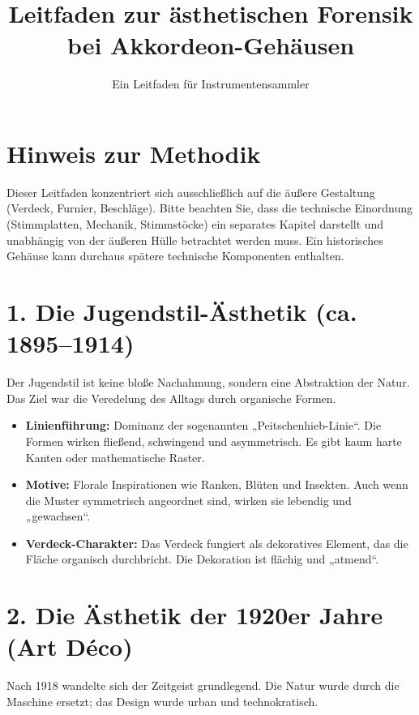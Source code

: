 \documentclass[12pt,a4paper]{report}
\title{Leitfaden zur ästhetischen Forensik bei Akkordeon-Gehäusen}
\author{Ein Leitfaden für Instrumentensammler}
\date{}
\begin{document}
	
	\maketitle
	
	\section*{Hinweis zur Methodik}
	Dieser Leitfaden konzentriert sich ausschließlich auf die äußere Gestaltung (Verdeck, Furnier, Beschläge). Bitte beachten Sie, dass die technische Einordnung (Stimmplatten, Mechanik, Stimmstöcke) ein separates Kapitel darstellt und unabhängig von der äußeren Hülle betrachtet werden muss. Ein historisches Gehäuse kann durchaus spätere technische Komponenten enthalten.
	
	\section*{1. Die Jugendstil-Ästhetik (ca. 1895–1914)}
	Der Jugendstil ist keine bloße Nachahmung, sondern eine Abstraktion der Natur. Das Ziel war die Veredelung des Alltags durch organische Formen.
	
	\begin{itemize}
		\item \textbf{Linienführung:} Dominanz der sogenannten „Peitschenhieb-Linie“. Die Formen wirken fließend, schwingend und asymmetrisch. Es gibt kaum harte Kanten oder mathematische Raster.
		\item \textbf{Motive:} Florale Inspirationen wie Ranken, Blüten und Insekten. Auch wenn die Muster symmetrisch angeordnet sind, wirken sie lebendig und „gewachsen“.
		\item \textbf{Verdeck-Charakter:} Das Verdeck fungiert als dekoratives Element, das die Fläche organisch durchbricht. Die Dekoration ist flächig und „atmend“.
	\end{itemize}
	
	\section*{2. Die Ästhetik der 1920er Jahre (Art Déco)}
	Nach 1918 wandelte sich der Zeitgeist grundlegend. Die Natur wurde durch die Maschine ersetzt; das Design wurde urban und technokratisch.
	
\end{document}

